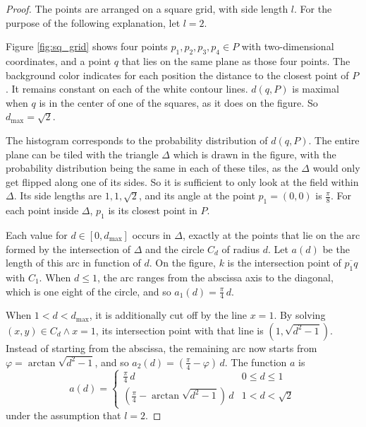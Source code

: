 \begin{proof}
The points are arranged on a square grid, with side length $l$. For the purpose of the following explanation, let $l = 2$.

Figure \ref{fig:sq_grid} shows four points $p_1, p_2, p_3, p_4 \in P$ with two-dimensional coordinates, and a point $q$ that lies on the same plane as those four points. The background color indicates for each position the distance to the closest point of $P$. It remains constant on each of the white contour lines. $d(q, P)$ is maximal when $q$ is in the center of one of the squares, as it does on the figure. So $d_{\text{max}} = \sqrt{2}$.

The histogram corresponds to the probability distribution of $d(q, P)$. The entire plane can be tiled with the triangle $\Delta$ which is drawn in the figure, with the probability distribution being the same in each of these tiles, as the $\Delta$ would only get flipped along one of its sides. So it is sufficient to only look at the field within $\Delta$. Its side lengths are $1, 1, \sqrt{2}$, and its angle at the point $p_1 = (0, 0)$ is $\frac{\pi}{8}$. For each point inside $\Delta$, $p_1$ is its closest point in $P$.

Each value for $d \in [0, d_{\text{max}}]$ occurs in $\Delta$, exactly at the points that lie on the arc formed by the intersection of $\Delta$ and the circle $C_d$ of radius $d$. Let $a(d)$ be the length of this arc in function of $d$. On the figure, $k$ is the intersection point of $\overline{p_1 q}$ with $C_1$. When $d \leq 1$, the arc ranges from the abscissa axis to the diagonal, which is one eight of the circle, and so $a_1(d) = \frac{\pi}{4} \, d$.

When $1 < d < d_{\text{max}}$, it is additionally cut off by the line $x = 1$. By solving $(x, y) \in C_d \wedge x = 1$, its intersection point with that line is $(1, \sqrt{d^2 - 1})$. Instead of starting from the abscissa, the remaining arc now starts from $\varphi = \arctan{\sqrt{d^2 - 1}}$, and so $a_2(d) = (\frac{\pi}{4} - \varphi) \, d$. The function $a$ is
\begin{equation}
a(d) = \begin{cases}
	\frac{\pi}{4} \, d & 0 \leq d \leq 1 \\
	\left( \frac{\pi}{4} - \arctan{\sqrt{d^2 - 1}} \right) \, d & 1 < d < \sqrt{2}
\end{cases}
\end{equation}
under the assumption that $l = 2$.


\end{proof}
